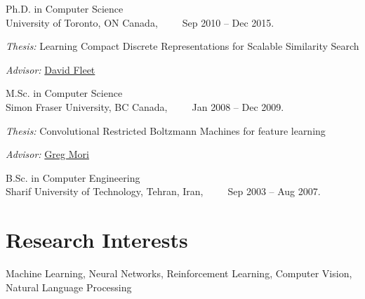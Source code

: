 \documentclass[10pt,letterpaper]{article}
\renewenvironment{itemize}{
  \begin{list}{}{
    \setlength{\leftmargin}{1.5em}
  }
}{
  \end{list}
}
\begin{document}
\begin{itemize}
  \item Ph.D. in Computer Science\\
    University of Toronto, ON Canada,~~~~~Sep 2010 -- Dec 2015.
    \begin{itemize}
    \item \textit{Thesis:} Learning Compact Discrete Representations for
Scalable Similarity Search
    \item \textit{Advisor:} \href{http://www.cs.toronto.edu/~fleet/}{David Fleet}
    \end{itemize}

  \item M.Sc. in Computer Science\\
    Simon Fraser University, BC Canada,~~~~~Jan 2008 -- Dec 2009.
    \begin{itemize}
    \item \textit{Thesis:} Convolutional Restricted Boltzmann Machines for feature learning
    \item \textit{Advisor:} \href{http://www.cs.sfu.ca/~mori/}{Greg Mori}%
    \end{itemize}

  \item B.Sc. in Computer Engineering\\
    Sharif University of Technology, Tehran, Iran,~~~~~Sep 2003 -- Aug 2007.
\end{itemize}

\section*{Research Interests}

Machine Learning, Neural Networks, Reinforcement Learning, Computer Vision, Natural Language Processing
\end{document}

